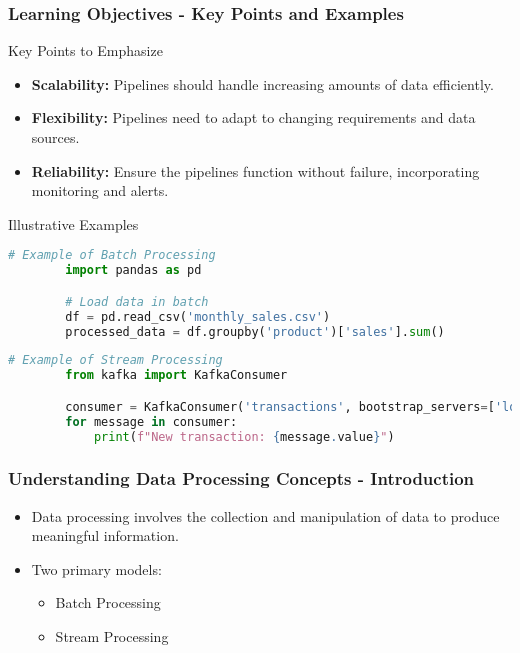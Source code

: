 \documentclass{beamer}
\begin{document}
\begin{frame}[fragile]
    \frametitle{Learning Objectives - Key Points and Examples}
    \begin{block}{Key Points to Emphasize}
        \begin{itemize}
            \item \textbf{Scalability:} Pipelines should handle increasing amounts of data efficiently.
            \item \textbf{Flexibility:} Pipelines need to adapt to changing requirements and data sources.
            \item \textbf{Reliability:} Ensure the pipelines function without failure, incorporating monitoring and alerts.
        \end{itemize}
    \end{block}
    
    \begin{block}{Illustrative Examples}
        \begin{lstlisting}[language=Python]
        # Example of Batch Processing
        import pandas as pd

        # Load data in batch
        df = pd.read_csv('monthly_sales.csv')
        processed_data = df.groupby('product')['sales'].sum()
        \end{lstlisting}
        
        \begin{lstlisting}[language=Python]
        # Example of Stream Processing
        from kafka import KafkaConsumer

        consumer = KafkaConsumer('transactions', bootstrap_servers=['localhost:9092'])
        for message in consumer:
            print(f"New transaction: {message.value}")
        \end{lstlisting}
    \end{block}
\end{frame}

\begin{frame}[fragile]
    \frametitle{Understanding Data Processing Concepts - Introduction}
    \begin{itemize}
        \item Data processing involves the collection and manipulation of data to produce meaningful information.
        \item Two primary models:
        \begin{itemize}
            \item Batch Processing
            \item Stream Processing
        \end{itemize}
    \end{itemize}
\end{frame}
\end{document}
